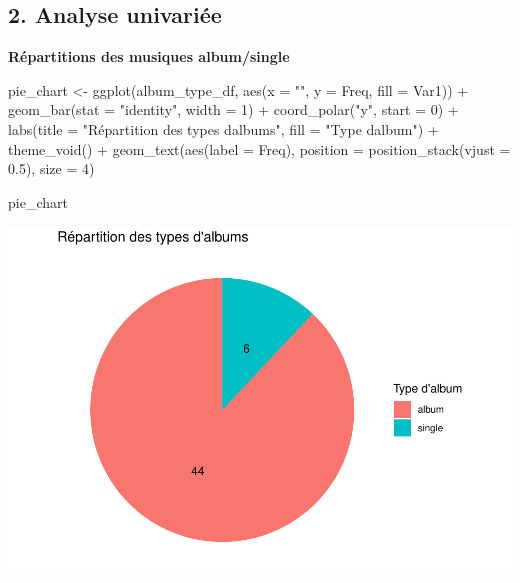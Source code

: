 \documentclass[
]{article}
\newenvironment{Shaded}{\begin{snugshade}}{\end{snugshade}}
\newcommand{\AttributeTok}[1]{\textcolor[rgb]{0.77,0.63,0.00}{#1}}
\newcommand{\DecValTok}[1]{\textcolor[rgb]{0.00,0.00,0.81}{#1}}
\newcommand{\FloatTok}[1]{\textcolor[rgb]{0.00,0.00,0.81}{#1}}
\newcommand{\FunctionTok}[1]{\textcolor[rgb]{0.00,0.00,0.00}{#1}}
\newcommand{\NormalTok}[1]{#1}
\newcommand{\OtherTok}[1]{\textcolor[rgb]{0.56,0.35,0.01}{#1}}
\newcommand{\SpecialCharTok}[1]{\textcolor[rgb]{0.00,0.00,0.00}{#1}}
\newcommand{\StringTok}[1]{\textcolor[rgb]{0.31,0.60,0.02}{#1}}
\begin{document}
\hypertarget{analyse-univariuxe9e}{%
\subsection{2. Analyse univariée}\label{analyse-univariuxe9e}}

\textbf{Répartitions des musiques album/single}

\begin{Shaded}
\begin{Highlighting}[]
\NormalTok{pie\_chart }\OtherTok{\textless{}{-}} \FunctionTok{ggplot}\NormalTok{(album\_type\_df, }\FunctionTok{aes}\NormalTok{(}\AttributeTok{x =} \StringTok{""}\NormalTok{, }\AttributeTok{y =}\NormalTok{ Freq, }\AttributeTok{fill =}\NormalTok{ Var1)) }\SpecialCharTok{+}
  \FunctionTok{geom\_bar}\NormalTok{(}\AttributeTok{stat =} \StringTok{"identity"}\NormalTok{, }\AttributeTok{width =} \DecValTok{1}\NormalTok{) }\SpecialCharTok{+}
  \FunctionTok{coord\_polar}\NormalTok{(}\StringTok{"y"}\NormalTok{, }\AttributeTok{start =} \DecValTok{0}\NormalTok{) }\SpecialCharTok{+}
  \FunctionTok{labs}\NormalTok{(}\AttributeTok{title =} \StringTok{"Répartition des types d\textquotesingle{}albums"}\NormalTok{, }\AttributeTok{fill =} \StringTok{"Type d\textquotesingle{}album"}\NormalTok{) }\SpecialCharTok{+}
  \FunctionTok{theme\_void}\NormalTok{() }\SpecialCharTok{+}
  \FunctionTok{geom\_text}\NormalTok{(}\FunctionTok{aes}\NormalTok{(}\AttributeTok{label =}\NormalTok{ Freq), }\AttributeTok{position =} \FunctionTok{position\_stack}\NormalTok{(}\AttributeTok{vjust =} \FloatTok{0.5}\NormalTok{), }\AttributeTok{size =} \DecValTok{4}\NormalTok{)}

\NormalTok{pie\_chart}
\end{Highlighting}
\end{Shaded}

\includegraphics{spotify_analysis_files/figure-latex/unnamed-chunk-3-1.pdf}
\end{document}
